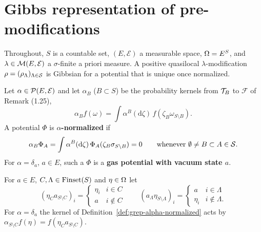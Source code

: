 \section{Gibbs representation of pre-modifications}

Throughout, $S$ is a countable set, $(E,\mathcal{E})$ a measurable space, $\Omega = E^S$, and
$\lambda \in \mathcal{M}(E,\mathcal{E})$ a $\sigma$-finite a priori measure.  A positive quasilocal
$\lambda$-modification $\rho = (\rho_\Lambda)_{\Lambda \in \mathcal{S}}$ is Gibbsian for a potential that
is unique once normalized.

\begin{definition}
    \label{def:grep-alpha-normalized}

    Let $\alpha \in \mathcal{P}(E,\mathcal{E})$ and let $\alpha_B$ ($B \subset S$) be the probability
    kernels from $\mathcal{T}_B$ to $\mathcal{F}$ of Remark (1.25),
    \[
        \alpha_B f(\omega) = \int \alpha^B(\mathrm{d}\zeta)\, f(\zeta_B \omega_{S \setminus B}).
    \]
    A potential $\Phi$ is \textbf{$\alpha$-normalized} if
    \[
        \alpha_B \Phi_A = \int \alpha^B(\mathrm{d}\zeta)\, \Phi_A(\zeta_B \sigma_{S\setminus B}) = 0
        \qquad \text{whenever } \emptyset \neq B \subset A \in \mathcal{S} .
    \]
    For $\alpha = \delta_a$, $a \in E$, such a $\Phi$ is a \textbf{gas potential with vacuum
    state $a$}.
\end{definition}

\begin{definition}
    \label{def:grep-vacuum}
    \leanok

    For $a \in E$, $C, \Lambda \in \operatorname{Finset}(S)$ and $\eta \in \Omega$ let
    \[
        (\eta_C a_{S \setminus C})_i = \begin{cases} \eta_i & i \in C \\ a & i \notin C\end{cases}
        \qquad
        (a_\Lambda \eta_{S\setminus\Lambda})_i = \begin{cases} a & i \in \Lambda \\ \eta_i & i \notin \Lambda .\end{cases}
    \]
    For $\alpha = \delta_a$ the kernel of Definition~\ref{def:grep-alpha-normalized} acts by
    $\alpha_{S\setminus C} f(\eta) = f(\eta_C a_{S\setminus C})$.
\end{definition}

